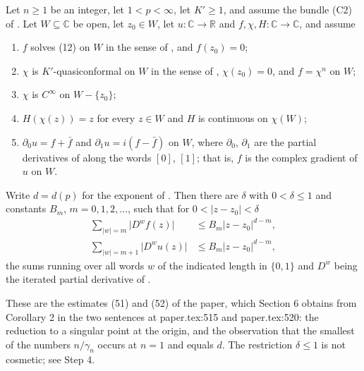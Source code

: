\begin{lemma}
Let $n\ge1$ be an integer, let $1<p<\infty$, let $K'\ge1$, and assume the
bundle (C2) of .  Let $W\subseteq\mathbb{C}$ be open, let
$z_0\in W$, let $u\colon\mathbb{C}\to\mathbb{R}$ and
$f,\chi,H\colon\mathbb{C}\to\mathbb{C}$, and assume
\begin{enumerate}
\item[(H1)] $f$ solves (12) on $W$ in the sense of , and
  $f(z_0)=0$;
\item[(H2)] $\chi$ is $K'$-quasiconformal on $W$ in the sense of
  , $\chi(z_0)=0$, and $f=\chi^{n}$ on $W$;
\item[(H3)] $\chi$ is $C^\infty$ on $W-\{z_0\}$;
\item[(H4)] $H(\chi(z))=z$ for every $z\in W$ and $H$ is continuous on
  $\chi(W)$;
\item[(H5)] $\partial_0u=f+\bar f$ and $\partial_1u=i(f-\bar f)$ on $W$, where
  $\partial_0$, $\partial_1$ are the partial derivatives of
   along the words $[0]$, $[1]$; that is, $f$ is the
  complex gradient of $u$ on $W$.
\end{enumerate}
Write $d=d(p)$ for the exponent of .  Then there are $\delta$
with $0<\delta\le1$ and constants $B_m$, $m=0,1,2,\dots$, such that for
$0<|z-z_0|<\delta$
\begin{align}
  \sum_{|w|=m}\bigl|D^{w}f(z)\bigr|&\le B_m|z-z_0|^{d-m},\tag{51}\\
  \sum_{|w|=m+1}\bigl|D^{w}u(z)\bigr|&\le B_m|z-z_0|^{d-m},\tag{52}
\end{align}
the sums running over all words $w$ of the indicated length in $\{0,1\}$ and
$D^{w}$ being the iterated partial derivative of .

These are the estimates (51) and (52) of the paper, which Section 6 obtains
from Corollary 2 in the two sentences at paper.tex:515 and paper.tex:520: the
reduction to a singular point at the origin, and the observation that the
smallest of the numbers $n/\gamma_n$ occurs at $n=1$ and equals $d$.  The
restriction $\delta\le1$ is not cosmetic; see Step 4.
\end{lemma}
